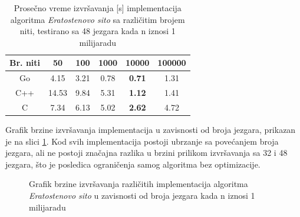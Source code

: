 \documentclass[12pt,oneside]{memoir}
\begin{document}
\begin{table}
\begin{center}
\caption{Prosečno vreme izvršavanja [s] implementacija algoritma \textit{Eratostenovo sito} sa različitim brojem niti, testirano sa 48 jezgara kada n iznosi 1 milijaradu}
\begin{tabular}{||c||c c c c c||}
\hline
Br. niti		&50 &100 &1000 &10000&100000\\ \hline
Go	&4.15	&3.21	&0.78&\textbf{0.71}&1.31\\ \hline
C++  &14.53&9.84	&5.31&\textbf{1.12}&1.41\\ \hline
C	&7.34	&6.13	&5.02&\textbf{2.62}&4.72\\ \hline
\end{tabular}
\label{tab:prime5}
\end{center}
\end{table}

Grafik brzine izvršavanja implementacija u zavisnosti od broja jezgara, prikazan je na slici \ref{fig:prime3}. Kod svih implementacija postoji ubrzanje sa povećanjem broja jezgara, ali ne postoji značajna razlika u brzini prilikom izvršavanja sa 32  i 48 jezgara, što je posledica ograničenja samog algoritma bez optimizacije.

\begin{figure}
\begin{center}


\caption{Grafik brzine izvršavanja različitih implementacija algoritma \textit{Eratostenovo sito} u zavisnosti od broja jezgara  kada n iznosi 1 milijaradu}
\label{fig:prime3}
\end{center}
\end{figure}
\end{document}
